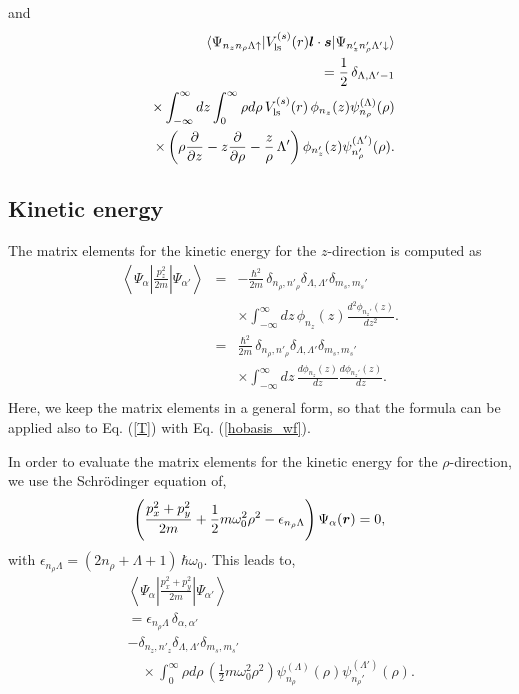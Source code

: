 \documentclass[superscriptaddress,twocolumn,amsmath,amssymb]{revtex4}
\renewcommand{\vec}[1]{\mbox{\boldmath $#1$}}
\begin{document}
%
and
%
\begin{eqnarray}
&&\langle\Psi_{n_zn_\rho\Lambda \uparrow}
|V_{\rm ls}^{(s)}(r)\vec{l}\cdot\vec{s}|\Psi_{n'_zn'_\rho\Lambda' \downarrow}\rangle 
\nonumber \\
&&\quad=\frac{1}{2}\,\delta_{\Lambda,\Lambda'-1} \nonumber \\
&&\quad\times\int^\infty_{-\infty}dz \int^{\infty}_0\rho d\rho\,
V_{\rm ls}^{(s)}(r)\,
\phi_{n_z}(z)\psi_{n_\rho}^{(\Lambda)}(\rho)\nonumber \\
&&\quad\times 
\left(\rho\frac{\partial}{\partial z}-z\frac{\partial}{\partial \rho}
- \frac{z}{\rho}\,\Lambda'\right) 
\phi_{n_z'}(z) 
\psi_{n_\rho'}^{(\Lambda')}(\rho). 
\end{eqnarray}

\subsection{Kinetic energy}

The matrix elements for the kinetic energy for the $z$-direction 
is computed as 
%
\begin{eqnarray}
\left\langle \Psi_\alpha\left|\frac{p_z^2}{2m}\right|\Psi_{\alpha'}\right\rangle 
&=& -\frac{\hbar^2}{2m}\,\delta_{n_\rho,n'_\rho}\delta_{\Lambda,\Lambda'}\delta_{m_s,m_s'} \nonumber \\
&&\times\int^\infty_{-\infty}dz \,
\phi_{n_z}(z)
\frac{d^2\phi_{n_z'}(z)}{dz^2}. \nonumber \\
&=& \frac{\hbar^2}{2m}\,\delta_{n_\rho,n'_\rho}\delta_{\Lambda,\Lambda'}\delta_{m_s,m_s'} \nonumber \\
&&\times\int^\infty_{-\infty}dz \,
\frac{d\phi_{n_z}(z)}{dz}
\frac{d\phi_{n_z'}(z)}{dz}. \nonumber \\
\end{eqnarray}
%
Here, we keep the matrix elements in a general form, so that the 
formula can be applied also to Eq. (\ref{T}) with Eq. (\ref{hobasis_wf}). 

In order to evaluate the matrix elements for the kinetic energy for 
the $\rho$-direction, we use the Schr\"odinger equation of, 
%
\begin{equation}
\left(\frac{p_x^2+p_y^2}{2m}+\frac{1}{2}m\omega_0^2\rho^2-\epsilon_{n_\rho\Lambda}
\right)\Psi_\alpha(\vec{r})=0,
\end{equation}
%
with $\epsilon_{n_\rho \Lambda}=(2n_\rho + \Lambda+1)\,\hbar\omega_0$. 
This leads to, 
%
\begin{eqnarray}
&&\left\langle \Psi_\alpha\left|\frac{p_x^2+p_y^2}{2m}
\right|\Psi_{\alpha'}\right\rangle \nonumber \\
&&= \epsilon_{n_\rho \Lambda}\,\delta_{\alpha,\alpha'} \nonumber \\
&&
-\delta_{n_z,n'_z}\delta_{\Lambda,\Lambda'}\delta_{m_s,m_s'}\,
 \nonumber \\
&&\quad\times \int^{\infty}_0\rho d\rho\,
\left(\frac{1}{2}m\omega_0^2\rho^2\right)\psi_{n_\rho}^{(\Lambda)}(\rho)\psi_{n_\rho'}^{(\Lambda')}(\rho). 
\end{eqnarray}
%
\end{document}
